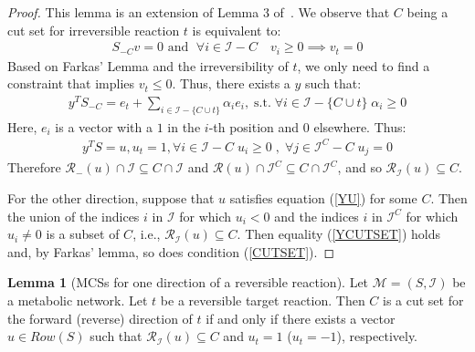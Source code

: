 \documentclass{bioinfo}
\theoremstyle{plain}
\theoremstyle{definition}
\newtheorem{lemma}{Lemma} %
\begin{document}
\begin{proof}%
This lemma is an extension of Lemma 3 of~\cite{Thesis}. %
We observe that $C$ being a cut set for irreversible reaction $t$ is equivalent to: 
\begin{align} \label{CUTSET}
    S_{-C}v = 0 \text{ and } \; \forall i \in \mathcal{I} - C \quad v_i \geq 0  \implies v_t = 0
\end{align}
Based on Farkas' Lemma and the irreversibility of $t$, we only need to find a constraint that implies $v_t \leq 0$. Thus, there exists a $y$ such that:
\begin{align} \label{YCUTSET}
    y^TS_{-C} = e_t + \sum_{i \in \mathcal{I} - \{C \cup t\}} \alpha_i e_i, \; \text{s.t.}\; \forall  i \in \mathcal{I} - \{C \cup t\} \; \alpha_i \geq 0 
\end{align} 
Here, $e_i$ is a vector with a $1$ in the $i$-th position and $0$ elsewhere. Thus:
\begin{align} \label{YU}
    y^TS = u, u_t = 1,  \forall i \in \mathcal{I} - C \; u_i \geq 0 \;, \; \forall  j \in \mathcal{I}^{C} - C \; u_j = 0 
\end{align}
Therefore $\mathcal{R}_{-}(u) \cap \mathcal{I} \subseteq C \cap \mathcal{I}$ and $\mathcal{R}(u) \cap \mathcal{I}^{C} \subseteq C \cap \mathcal{I}^{C}$, and so $\mathcal{R}_{\mathcal{I}}(u) \subseteq C$. 

For the other direction, suppose that $u$ satisfies equation (\ref{YU}) for some $C$. Then the union of the indices $i$ in $\mathcal{I}$ for which $u_i < 0$ and the indices $i$ in $\mathcal{I}^{C}$ for which $u_i \neq 0$ is a subset of $C$, i.e., $\mathcal{R}_{\mathcal{I}}(u) \subseteq C$. Then equality (\ref{YCUTSET}) holds and, by Farkas' lemma, so does condition (\ref{CUTSET}).
\end{proof}

\begin{lemma} [MCSs for one direction of a reversible reaction] \label{GR}
Let $\mathcal{M} = (S, \mathcal{I})$ be a metabolic network. %
Let $t$ be a reversible target reaction. Then $C$ is a cut set for the forward (reverse) direction of $t$ if and only if there exists a vector $u \in Row(S)$ such that $\mathcal{R}_{\mathcal{I}}(u) \subseteq C$ and $u_t = 1$ ($u_t = -1$), respectively.
\end{lemma}
\end{document}
